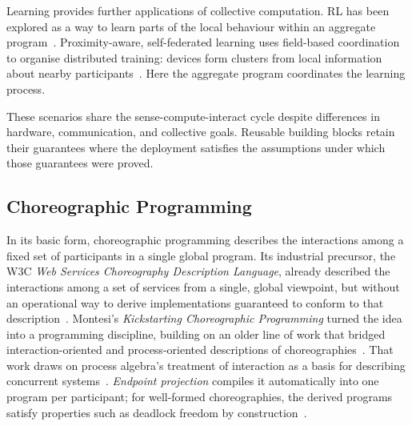 Learning provides further applications of collective computation.
\ac{RL} has been explored as a way to learn parts of the local behaviour within an aggregate program~\cite{aguzzi2022towards}.
Proximity-aware, self-federated learning uses field-based coordination to organise distributed training:
devices form clusters from local information about nearby participants~\cite{DBLP:journals/iot/DominiFAVE26}.
Here the aggregate program coordinates the learning process.

These scenarios share the sense-compute-interact cycle despite differences in hardware,
communication,
and collective goals.
Reusable building blocks retain their guarantees where the deployment satisfies the assumptions under which those guarantees were proved.

\subsection{Choreographic Programming}
\label{subsec:choreographic-programming}

In its basic form, choreographic programming describes the interactions among a fixed set of participants in a single global program.
%
Its industrial precursor, the W3C \emph{Web Services Choreography Description Language},
already described the interactions among a set of services from a single, global viewpoint,
but without an operational way to derive implementations guaranteed to conform to that description~\cite{WSCDL}.
%
Montesi's \emph{Kickstarting Choreographic Programming} turned the idea into a programming discipline,
building on an older line of work that bridged interaction-oriented and process-oriented descriptions of choreographies~\cite{Montesi:2014,10.1109/SEFM.2008.11}.
%
That work draws on process algebra's treatment of interaction as a basis for describing concurrent systems~\cite{10.1016/j.tcs.2004.07.036}.
%
\emph{Endpoint projection} compiles it automatically into one program per participant;
for well-formed choreographies,
the derived programs satisfy properties such as deadlock freedom by construction~\cite{10.1145/2429069.2429101}.

